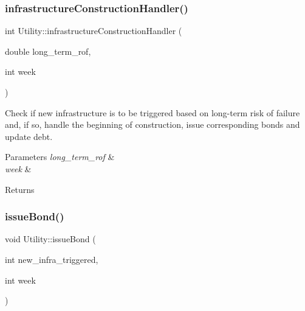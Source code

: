 \mbox{\label{classUtility_ae93114986578d3d3fbae56f271ac7df6_ae93114986578d3d3fbae56f271ac7df6}} 
\subsubsection{\texorpdfstring{infrastructure\+Construction\+Handler()}{infrastructureConstructionHandler()}}
{\footnotesize\ttfamily int Utility\+::infrastructure\+Construction\+Handler (\begin{DoxyParamCaption}\item[{double}]{long\+\_\+term\+\_\+rof,  }\item[{int}]{week }\end{DoxyParamCaption})}

Check if new infrastructure is to be triggered based on long-\/term risk of failure and, if so, handle the beginning of construction, issue corresponding bonds and update debt. 
\begin{DoxyParams}{Parameters}
{\em long\+\_\+term\+\_\+rof} & \\
\hline
{\em week} & \\
\hline
\end{DoxyParams}
\begin{DoxyReturn}{Returns}

\end{DoxyReturn}
\mbox{\label{classUtility_a152ceea2917ea7715e8fbf8aff24390f_a152ceea2917ea7715e8fbf8aff24390f}} 
\subsubsection{\texorpdfstring{issue\+Bond()}{issueBond()}}
{\footnotesize\ttfamily void Utility\+::issue\+Bond (\begin{DoxyParamCaption}\item[{int}]{new\+\_\+infra\+\_\+triggered,  }\item[{int}]{week }\end{DoxyParamCaption})}

\mbox{\label{classUtility_ae2dad8029e34c5bb073a5ddf4381d278_ae2dad8029e34c5bb073a5ddf4381d278}} 
